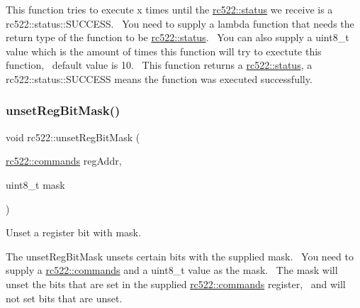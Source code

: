 This function tries to execute x times until the \hyperlink{classspiReader_a4bcf984823c38cf4841ebf619e788790}{rc522\+::status} we receive is a rc522\+::status\+::\+S\+U\+C\+C\+E\+SS.~\newline
You need to supply a lambda function that needs the return type of the function to be \hyperlink{classspiReader_a4bcf984823c38cf4841ebf619e788790}{rc522\+::status}.~\newline
You can also supply a uint8\+\_\+t value which is the amount of times this function will try to exectute this function,~\newline
 default value is 10.~\newline
This function returns a \hyperlink{classspiReader_a4bcf984823c38cf4841ebf619e788790}{rc522\+::status}, a rc522\+::status\+::\+S\+U\+C\+C\+E\+SS means the function was executed successfully. \mbox{\label{classrc522_a18c7a632fbb1206326008025c522ef20}} 
\subsubsection{\texorpdfstring{unset\+Reg\+Bit\+Mask()}{unsetRegBitMask()}\hspace{0.1cm}{\footnotesize\ttfamily [1/4]}}
{\footnotesize\ttfamily void rc522\+::unset\+Reg\+Bit\+Mask (\begin{DoxyParamCaption}\item[{\hyperlink{classrc522_a6df2359c88d6c2f47faf58bc9e09eaa4}{rc522\+::commands}}]{reg\+Addr,  }\item[{uint8\+\_\+t}]{mask }\end{DoxyParamCaption})}



Unset a register bit with mask. 

The unset\+Reg\+Bit\+Mask unsets certain bits with the supplied mask.~\newline
You need to supply a \hyperlink{classrc522_a6df2359c88d6c2f47faf58bc9e09eaa4}{rc522\+::commands} and a uint8\+\_\+t value as the mask.~\newline
The mask will unset the bits that are set in the supplied \hyperlink{classrc522_a6df2359c88d6c2f47faf58bc9e09eaa4}{rc522\+::commands} register,~\newline
and will not set bits that are unset. \mbox{\label{classrc522_ad5a055b560cb7e84801497a6acad1e70}} 
